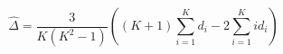 

\[
\hat{\Delta} = \frac{3}{K(K^2-1)} \left( (K+1)\sum_{i=1}^{K}{d_{i}} - 2\sum_{i=1}^{K}{id_{i}} \right)
\]


